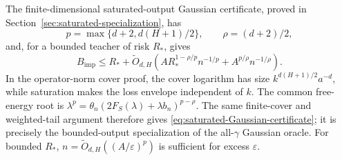 The finite-dimensional saturated-output Gaussian certificate, proved in Section~\ref{sec:saturated-specialization}, has
\begin{equation}
 p=\max\{d+2,d(H+1)/2\},\qquad \rho=(d+2)/2,
 \label{eq:saturated-exponents}
\end{equation}
and, for a bounded teacher of risk $R_*$, gives
\begin{equation}
 B_{\mathrm{imp}}\le R_*+
 \widetilde O_{d,H}\left(
       A R_*^{1-\rho/p}n^{-1/p}+A^{p/\rho}n^{-1/\rho}\right).
 \label{eq:saturated-Gaussian-certificate}
\end{equation}
In the operator-norm cover proof, the cover logarithm has size $k^{d(H+1)/2}a^{-d}$, while saturation makes the loss envelope independent of $k$. The common free-energy root is
$\lambda^p=\theta_n(2F_S(\lambda)+\lambda b_n)^{p-\rho}$.
The same finite-cover and weighted-tail argument therefore gives \eqref{eq:saturated-Gaussian-certificate}; it is precisely the bounded-output specialization of the all-$\gamma$ Gaussian oracle. For bounded $R_*$, $n=\widetilde O_{d,H}((A/\varepsilon)^p)$ is sufficient for excess $\varepsilon$.

